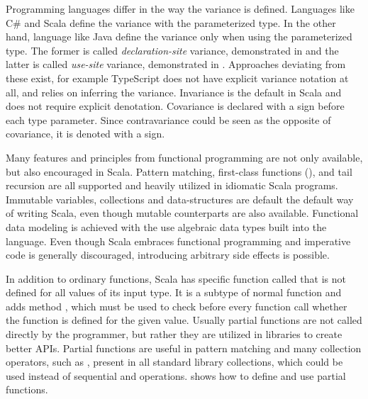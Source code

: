 

Programming languages differ in the way the variance is defined. Languages like C\# and Scala define the variance with the parameterized type. In the other hand, language like Java define the variance only when using the parameterized type. The former is called \textit{declaration-site} variance, demonstrated in  and the latter is called \textit{use-site} variance, demonstrated in . Approaches deviating from these exist, for example TypeScript does not have explicit variance notation at all, and relies on inferring the variance. Invariance is the default in Scala and does not require explicit denotation. Covariance is declared with a \inlinecode{+} sign before each type parameter. Since contravariance could be seen as the opposite of covariance, it is denoted with a \inlinecode{-} sign.





Many features and principles from functional programming are not only available, but also encouraged in Scala. Pattern matching, first-class functions (), and tail recursion are all supported and heavily utilized in idiomatic Scala programs. Immutable variables, collections and data-structures are default the default way of writing Scala, even though mutable counterparts are also available. Functional data modeling is achieved with the use algebraic data types built into the language. Even though Scala embraces functional programming and imperative code is generally discouraged, introducing arbitrary side effects is possible.



In addition to ordinary functions, Scala has specific function called  that is not defined for all values of its input type. It is a subtype of normal function and adds method , which must be used to check before every function call whether the function is defined for the given value. Usually partial functions are not called directly by the programmer, but rather they are utilized in libraries to create better APIs. Partial functions are useful in pattern matching and many collection operators, such as , present in all standard library collections, which could be used instead of sequential  and  operations.  shows how to define and use partial functions.

